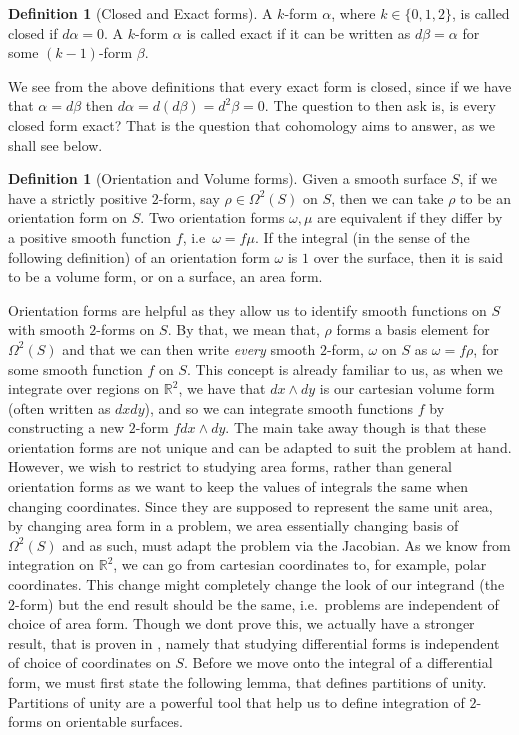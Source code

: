 \documentclass[11pt]{report}
\theoremstyle{definition}
\newtheorem{defn}[thm]{Definition}
\begin{document}
\begin{defn}[Closed and Exact forms]
  A $k$-form $\alpha$, where $k \in \{0,1,2\}$, is called closed if $d\alpha = 0$. A $k$-form $\alpha$ is called exact if it can be written as $d\beta = \alpha$ for some $(k-1)$-form $\beta$.
\end{defn}
We see from the above definitions that every exact form is closed, since if we have that $\alpha = d\beta $ then $d\alpha = d(d\beta) = d^2\beta = 0$. The question to then ask is, is every closed form exact? That is the question that cohomology aims to answer, as we shall see below.
\begin{defn}[Orientation and Volume forms]\label{volumeform}
  Given a smooth surface $S$, if we have a strictly positive $2$-form, say $\rho \in \Omega^2(S)$ on $S$, then we can take $\rho$ to be an orientation form on $S$. Two orientation forms $\omega, \mu$ are equivalent if they differ by a positive smooth function $f$, i.e\ $\omega = f\mu$. If the integral (in the sense of the following definition) of an orientation form $\omega$ is $1$ over the surface, then it is said to be a volume form, or on a surface, an area form.
\end{defn}
Orientation forms are helpful as they allow us to identify smooth functions on $S$ with smooth $2$-forms on $S$. By that, we mean that, $\rho$ forms a basis element for $\Omega^2(S)$ and that we can then write \emph{every} smooth $2$-form, $\omega$ on $S$ as $\omega = f\rho$, for some smooth function $f$ on $S$. This concept is already familiar to us, as when we integrate over regions on $\mathbb{R}^2$, we have that $dx\wedge dy$ is our cartesian volume form (often written as $dxdy$), and so we can integrate smooth functions $f$ by constructing a new $2$-form $fdx\wedge dy$. The main take away though is that these orientation forms are not unique and can be adapted to suit the problem at hand. However, we wish to restrict to studying area forms, rather than general orientation forms as we want to keep the values of integrals the same when changing coordinates. Since they are supposed to represent the same unit area, by changing area form in a problem, we area essentially changing basis of $\Omega^2(S)$ and as such, must adapt the problem via the Jacobian. As we know from integration on $\mathbb{R}^2$, we can go from cartesian coordinates to, for example, polar coordinates. This change might completely change the look of our integrand (the $2$-form) but the end result should be the same, i.e.\ problems are independent of choice of area form. Though we dont prove this, we actually have a stronger result, that is proven in \cite{calcohomo}, namely that studying differential forms is independent of choice of coordinates on $S$. Before we move onto the integral of a differential form, we must first state the following lemma, that defines partitions of unity. Partitions of unity are a powerful tool that help us to define integration of $2$-forms on orientable surfaces.
\end{document}
